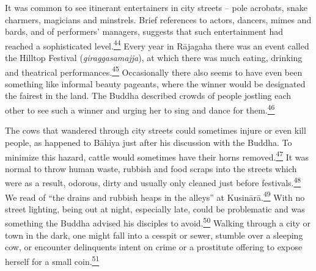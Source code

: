 It was common to see itinerant entertainers in city streets -- pole
acrobats, snake charmers, magicians and minstrels. Brief references to
actors, dancers, mimes and bards, and of performers' managers, suggests
that such entertainment had reached a sophisticated
level.\label{footprints_split_006.html_fnref44}\hyperref[footprints_split_024.htmlux5cux23fn44]{\textsuperscript{44}}
Every year in Rājagaha there was an event called the Hilltop Festival
(\emph{giraggasamajja}), at which there was much eating, drinking and
theatrical
performances.\label{footprints_split_006.html_fnref45}\hyperref[footprints_split_024.htmlux5cux23fn45]{\textsuperscript{45}}
Occasionally there also seems to have even been something like informal
beauty pageants, where the winner would be designated the fairest in the
land. The Buddha described crowds of people jostling each other to see
such a winner and urging her to sing and dance for
them.\label{footprints_split_006.html_fnref46}\hyperref[footprints_split_024.htmlux5cux23fn46]{\textsuperscript{46}}

The cows that wandered through city streets could sometimes injure or
even kill people, as happened to Bāhiya just after his discussion with
the Buddha. To minimize this hazard, cattle would sometimes have their
horns
removed.\label{footprints_split_006.html_fnref47}\hyperref[footprints_split_024.htmlux5cux23fn47]{\textsuperscript{47}}
It was normal to throw human waste, rubbish and food scraps into the
streets which were as a result, odorous, dirty and usually only cleaned
just before
festivals.\label{footprints_split_006.html_fnref48}\hyperref[footprints_split_024.htmlux5cux23fn48]{\textsuperscript{48}}
We read of ``the drains and rubbish heaps in the alleys'' at
Kusinārā.\label{footprints_split_006.html_fnref49}\hyperref[footprints_split_024.htmlux5cux23fn49]{\textsuperscript{49}}
With no street lighting, being out at night, especially late, could be
problematic and was something the Buddha advised his disciples to
avoid.\label{footprints_split_006.html_fnref50}\hyperref[footprints_split_024.htmlux5cux23fn50]{\textsuperscript{50}}
Walking through a city or town in the dark, one might fall into a
cesspit or sewer, stumble over a sleeping cow, or encounter delinquents
intent on crime or a prostitute offering to expose herself for a small
coin.\label{footprints_split_006.html_fnref51}\hyperref[footprints_split_024.htmlux5cux23fn51]{\textsuperscript{51}}

